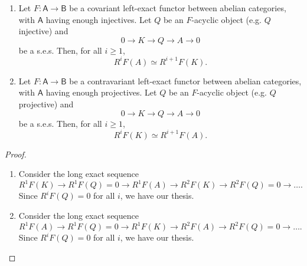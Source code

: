 \begin{thm}\leavevmode\vspace{-.2\baselineskip}
	\begin{enumerate}
		\item Let $F: \mathsf{A} \to \mathsf{B}$ be a covariant left-exact functor
			between abelian categories, with $\mathsf{A}$ having enough injectives.
			Let $Q$ be an $F$-acyclic object (e.g. $Q$ injective) and
			\begin{equation}
			0 \to K \to Q \to A \to 0
			\end{equation} 
			be a s.e.s.
			Then, for all $i \geq 1$,
			\begin{equation}
				R^iF(A) \simeq R^{i+1}F(K)
			.\end{equation} 
		\item Let $F: \mathsf{A} \to \mathsf{B}$ be a contravariant left-exact functor
			between abelian categories, with $\mathsf{A}$ having enough projectives.
			Let $Q$ be an $F$-acyclic object (e.g. $Q$ projective) and
			\begin{equation}
			0 \to K \to Q \to A \to 0
			\end{equation} 
			be a s.e.s.
			Then, for all $i \geq 1$,
			\begin{equation}
				R^iF(K) \simeq R^{i+1}F(A)
			.\end{equation} 
	\end{enumerate}
\end{thm}
\begin{proof}\leavevmode\vspace{-.2\baselineskip}
	\begin{enumerate}
		\item Consider the long exact sequence
			\begin{equation}
				R^1F(K) \to R^1F(Q) = 0 \to R^1F(A) \to
				R^2F(K) \to R^2F(Q) = 0 \to \ldots
			.\end{equation} 
			Since $R^iF(Q) = 0$ for all $i$, we have our thesis.
		\item Consider the long exact sequence
			\begin{equation}
				R^1F(A) \to R^1F(Q) = 0 \to R^1F(K) \to
				R^2F(A) \to R^2F(Q) = 0 \to \ldots
			.\end{equation} 
			Since $R^iF(Q) = 0$ for all $i$, we have our thesis.\qedhere
	\end{enumerate}
\end{proof}

